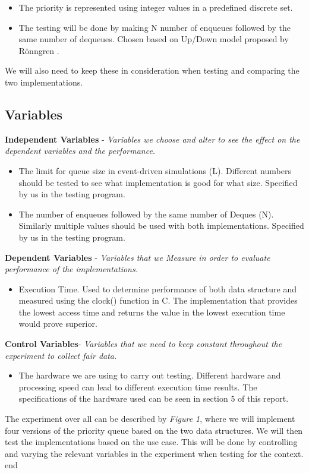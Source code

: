 \documentclass[12pt]{article}
\begin{document}
\begin{itemize}
   \item The priority is represented using integer values in a predefined discrete set. 
   \item The testing will be done by making N number of enqueues followed by the same number of dequeues. Chosen based on Up/Down model proposed by Rönngren  \cite{robert}. 
\end{itemize}

We will also need to keep these in consideration when testing and comparing the two implementations.

\subsection{Variables} 
\textbf{Independent Variables}  - \textit{Variables we choose and alter to see the effect on the dependent variables and the performance.}
\begin{itemize}
 \item The limit for queue size in event-driven simulations (L). Different numbers should be tested to see what implementation is good for what size. Specified by us in the testing program.
\item The number of enqueues followed by the same number of Deques (N). Similarly multiple values should be used with both implementations. Specified by us in the testing program.
\end{itemize}
\textbf{Dependent Variables} - \textit{Variables that we Measure in order to evaluate performance of the implementations.}
\begin{itemize}
\item Execution Time. Used to determine performance of both data structure and measured using the clock() function in C. The implementation that provides the lowest access time and returns the value in the lowest execution time would prove superior.
\end{itemize}
\textbf{Control Variables}- \textit{Variables that we need to keep constant throughout the experiment to collect fair data.}
\begin{itemize}
\item The hardware we are using to carry out testing. Different hardware and processing speed can lead to different execution time results. The specifications of the hardware used can be seen in section 5 of this report. 
\end{itemize}
The experiment over all can be described by \textit{Figure 1}, where we will implement four versions of the priority queue based on the two data structures. We will then test the implementations based on the use case. This will be done by controlling and varying the relevant variables in the experiment when testing for the context. 
end
\end{document}
